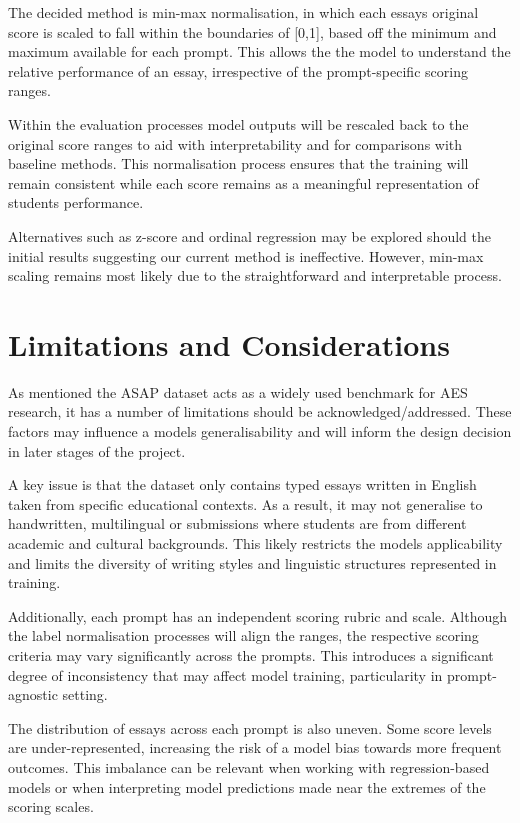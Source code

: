 \documentclass[12pt,a4paper]{report}
\begin{document}
The decided method is min-max normalisation, in which each essays original score is scaled to fall within the boundaries of [0,1], based off the minimum and maximum available for each prompt. This allows the the model to understand the relative performance of an essay, irrespective of the prompt-specific scoring ranges.

Within the evaluation processes model outputs will be rescaled back to the original score ranges to aid with interpretability and for comparisons with baseline methods. This normalisation process ensures that the training will remain consistent while each score remains as a meaningful representation of students performance.

Alternatives such as z-score and ordinal regression may be explored should the initial results suggesting our current method is ineffective. However, min-max scaling remains most likely due to the straightforward and interpretable process.

\section{Limitations and Considerations}
As mentioned the ASAP dataset acts as a widely used benchmark for AES research, it has a number of limitations should be acknowledged/addressed. These factors may influence a models generalisability and will inform the design decision in later stages of the project.

A key issue is that the dataset only contains typed essays written in English taken from specific educational contexts. As a result, it may not generalise to handwritten, multilingual or submissions where students are from different academic and cultural backgrounds. This likely restricts the models applicability and limits the diversity of writing styles and linguistic structures represented in training. 

Additionally, each prompt has an independent scoring rubric and scale. Although the label normalisation processes will align the ranges, the respective scoring criteria may vary significantly across the prompts. This introduces a significant degree of inconsistency that may affect model training, particularity in prompt-agnostic setting. 

The distribution of essays across each prompt is also uneven. Some score levels are under-represented, increasing the risk of a model bias towards more frequent outcomes. This imbalance can be relevant when working with regression-based models or when interpreting model predictions made near the extremes of the scoring scales.
\end{document}
